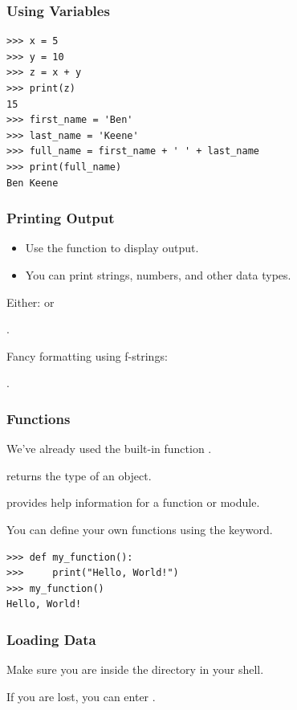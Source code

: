 \documentclass{beamer}
\begin{document}
\begin{frame}[fragile]
    \frametitle{Using Variables}
    \begin{lstlisting}[style=demo]
>>> x = 5
>>> y = 10
>>> z = x + y
>>> print(z)
15
>>> first_name = 'Ben'
>>> last_name = 'Keene'
>>> full_name = first_name + ' ' + last_name
>>> print(full_name)
Ben Keene
    \end{lstlisting}
\end{frame}

\begin{frame}[fragile]
    \frametitle{Printing Output}
    \begin{itemize}
        \item Use the  function to display output.
        \item You can print strings, numbers, and other data types.
    \end{itemize}
    \bigskip

    Either:  or

    .

    \bigskip

    Fancy formatting using f-strings:

    .
\end{frame}

\begin{frame}[fragile]
    \frametitle{Functions}
    We've already used the built-in function .

    \bigskip

     returns the type of an object.

     provides help information for a function or module.

    \bigskip

    You can define your own functions using the  keyword.

    \begin{lstlisting}[style=demo]
>>> def my_function():
>>>     print("Hello, World!")
>>> my_function()
Hello, World!
    \end{lstlisting}
\end{frame}

\begin{frame}[fragile]
    \frametitle{Loading Data}
    Make sure you are inside the  directory in your shell.

    \bigskip

    If you are lost, you can enter .
\end{frame}
\end{document}
